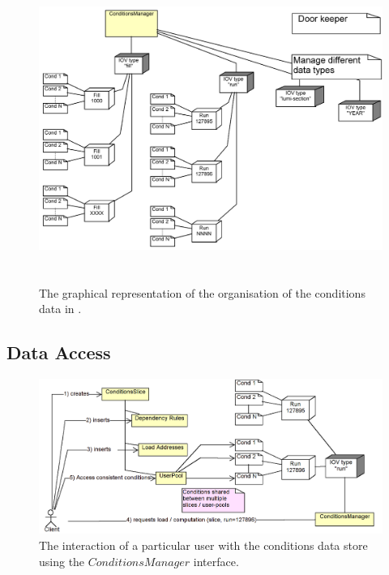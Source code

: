 \documentclass[10pt,a4paper]{article}
\begin{document}
\begin{figure}[h]
  \begin{center}\includegraphics[height=10cm] {DDCond-ConditionsStore.png}
    \caption{The graphical representation of the organisation of the
             conditions data in \DDH. }
    \label{fig:ddcond-data-organization}
  \end{center}
\end{figure}
\vspace{-0.5cm}

\subsection{Data Access}
\label{subsec:ddcond-data-access}

\begin{figure}[h]
  \begin{center}\includegraphics[width=15cm] {DDCond-ConditionsAccess.png}
    \caption{The interaction of a particular user with the conditions
             data store using the $ConditionsManager$ interface.}
    \label{fig:ddcond-data-organization}
  \end{center}
\end{figure}
\vspace{-0.5cm}
\end{document}
